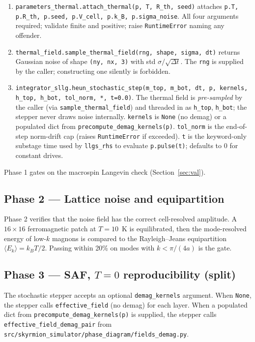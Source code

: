 \documentclass[11pt,a4paper]{article}
\newcommand{\kB}{k_B}
\begin{document}
\begin{enumerate}[leftmargin=2em]
    \item \texttt{parameters\_thermal.attach\_thermal(p, T, R\_th, seed)}
    attaches \texttt{p.T, p.R\_th, p.seed, p.V\_cell, p.k\_B,
    p.sigma\_noise}. All four arguments required; validate finite and
    positive; raise \texttt{RuntimeError} naming any offender.
    \item \texttt{thermal\_field.sample\_thermal\_field(rng, shape,
    sigma, dt)} returns Gaussian noise of shape
    \texttt{(ny, nx, 3)} with std $\sigma/\sqrt{\Delta t}$. The
    \texttt{rng} is supplied by the caller; constructing one
    silently is forbidden.
    \item \texttt{integrator\_sllg.heun\_stochastic\_step(m\_top,
    m\_bot, dt, p, kernels, h\_top, h\_bot, tol\_norm, *, t=0.0)}.
    The thermal field is \emph{pre-sampled} by the caller (via
    \texttt{sample\_thermal\_field}) and threaded in as
    \texttt{h\_top}, \texttt{h\_bot}; the stepper never draws noise
    internally. \texttt{kernels} is \texttt{None} (no demag) or a
    populated dict from \texttt{precompute\_demag\_kernels(p)}.
    \texttt{tol\_norm} is the end-of-step norm-drift cap (raises
    \texttt{RuntimeError} if exceeded). \texttt{t} is the
    keyword-only substage time used by \texttt{llgs\_rhs} to evaluate
    \texttt{p.pulse(t)}; defaults to 0 for constant drives.
\end{enumerate}

Phase 1 gates on the macrospin Langevin check
(Section~\ref{sec:val}).

\subsection{Phase 2 --- Lattice noise and equipartition}

Phase 2 verifies that the noise field has the correct cell-resolved
amplitude. A $16 \times 16$ ferromagnetic patch at $T = 10$~K is
equilibrated, then the mode-resolved energy of low-$k$ magnons is
compared to the Rayleigh--Jeans equipartition $\langle E_k \rangle =
\kB T / 2$. Passing within 20\% on modes with $k < \pi/(4a)$ is the
gate.

\subsection{Phase 3 --- SAF, $T=0$ reproducibility (split)}

The stochastic stepper accepts an optional
\texttt{demag\_kernels} argument. When \texttt{None}, the stepper
calls \texttt{effective\_field} (no demag) for each layer. When a
populated dict from \texttt{precompute\_demag\_kernels(p)} is
supplied, the stepper calls \texttt{effective\_field\_demag\_pair}
from \texttt{src/skyrmion\_simulator/phase\_diagram/fields\_demag.py}.
\end{document}
